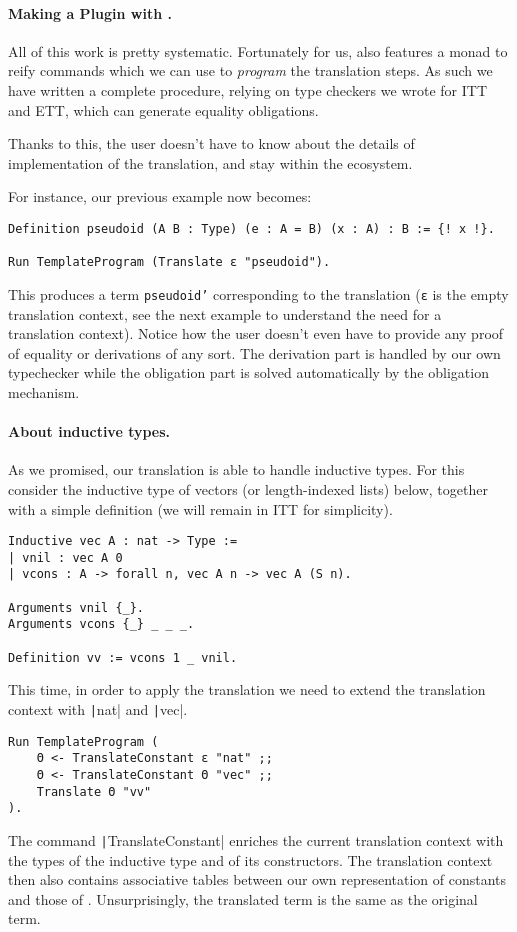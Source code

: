 \paragraph{Making a Plugin with \TemplateCoq.}
%
All of this work is pretty systematic. Fortunately for us,
\TemplateCoq also features a monad to reify \Coq commands which we can
use to \emph{program} the translation steps.
As such we have written a complete procedure, relying on type checkers we
wrote for ITT and ETT, which can generate equality obligations.

Thanks to this, the user doesn't have to know about the details of
implementation of the translation, and stay within the \Coq ecosystem.

For instance, our previous example now becomes:
%
\begin{verbatim}
Definition pseudoid (A B : Type) (e : A = B) (x : A) : B := {! x !}.

Run TemplateProgram (Translate ε "pseudoid").
\end{verbatim}
%
This produces a \Coq term \texttt{pseudoid'} corresponding to the
translation (\texttt{ε} is the empty translation
context, see the next example to understand the need for a
translation context).
Notice how the user doesn't even have to provide any proof of equality or
derivations of any sort. The derivation part is handled by our own typechecker
while the obligation part is solved automatically by the \Coq obligation mechanism.

\paragraph{About inductive types.}
%
As we promised, our translation is able to handle inductive types.
For this consider the inductive type of vectors (or length-indexed lists) below,
together with a simple definition (we will remain in ITT for simplicity).
%
\begin{verbatim}
Inductive vec A : nat -> Type :=
| vnil : vec A 0
| vcons : A -> forall n, vec A n -> vec A (S n).

Arguments vnil {_}.
Arguments vcons {_} _ _ _.

Definition vv := vcons 1 _ vnil.
\end{verbatim}
%
This time, in order to apply the translation we need to extend the translation
context with \texttt|nat| and \texttt|vec|.
%
\begin{verbatim}
Run TemplateProgram (
    Θ <- TranslateConstant ε "nat" ;;
    Θ <- TranslateConstant Θ "vec" ;;
    Translate Θ "vv"
).
\end{verbatim}
%
The command \texttt|TranslateConstant| enriches the current
translation context with the types of the inductive type and of its
constructors. The translation context then also contains associative
tables between our own representation of constants and those of \Coq.
Unsurprisingly, the translated \Coq term is the same as the original
term.


